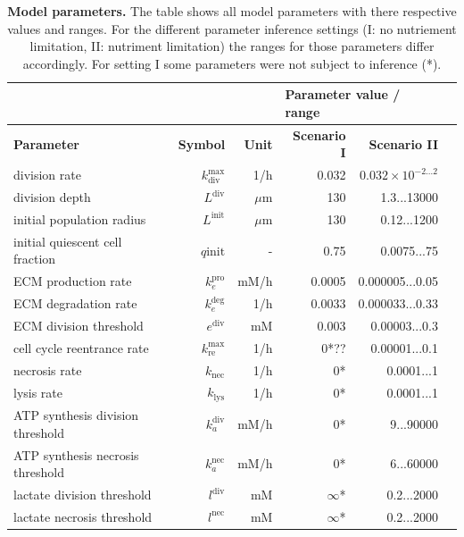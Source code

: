 \documentclass[10pt,letterpaper]{article}
\newcommand{\sI}[1]{{\color{red}#1}}
\newcommand{\sII}[1]{{\color{blue}#1}}
\begin{document}
\begin{table}[!ht]
\begin{adjustwidth}{-1in}{0in} %
\caption{
{\bf Model parameters.} The table shows all model parameters with there respective values and ranges. For the different parameter inference settings (I: no nutriement limitation, II: nutriment limitation) the ranges for those parameters differ accordingly. For setting I some parameters were not subject to inference (*).}
\begin{tabular}{|l|r|r|r|r|r|}
\hline
\multicolumn{3}{|l|}{\bf } & \multicolumn{2}{|l|}{\bf Parameter value / range}\\ \hline
{\bf Parameter} 					&{\bf Symbol} &{\bf Unit} &\sI{\bf Scenario I} &\sII{\bf Scenario II}\\ \hline
division rate 					&$k_{\text{div}}^{\max}$ & 1/h & 0.032 & $0.032 \times 10^{-2...2}$\\ \hline
division depth 					&$L^{\text{div}}$ & $\mu$m & 130 & 1.3...13000\\ \hline
initial population radius 			&$L^{\text{init}}$ & $\mu$m & 130 & 0.12...1200\\ \hline
initial quiescent cell fraction 		& $q{\text{init}}$ &-& 0.75& 0.0075...75\\ \hline
ECM production rate 			&$k_{e}^{\text{pro}}$  & {\color{green}mM}/h&0.0005 &0.000005...0.05\\ \hline
ECM degradation rate 			&$k_{e}^{\text{deg}}$ &1/h&0.0033 &0.000033...0.33\\ \hline
ECM division threshold 			&$e^{\text{div}}$ &{\color{green}mM} &0.003 &0.00003...0.3\\ \hline
\hline
cell cycle reentrance rate 			&$k^{\max}_{\text{re}}$ &1/h &0*{\color{green}??}&0.00001...0.1\\ \hline
necrosis rate 					&$k_{\text{nec}}$ &1/h&0*&0.0001...1\\ \hline
lysis rate 						&$k_{\text{lys}}$ &1/h&0*&0.0001...1\\ \hline
ATP synthesis division threshold 			&$k_a^{\text{div}}$ &mM/h& 0*& 9...90000\\ \hline
ATP synthesis necrosis threshold 			&$k_a^{\text{nec}}$ &mM/h& 0*& 6...60000\\ \hline
lactate division threshold 			&$l^{\text{div}}$  &mM&$\infty$* & 0.2...2000\\ \hline
lactate necrosis threshold 			&$l^{\text{nec}}$ &mM &$\infty$* & 0.2...2000\\ \hline

\end{tabular}
\end{adjustwidth}
\end{table}
\end{document}
